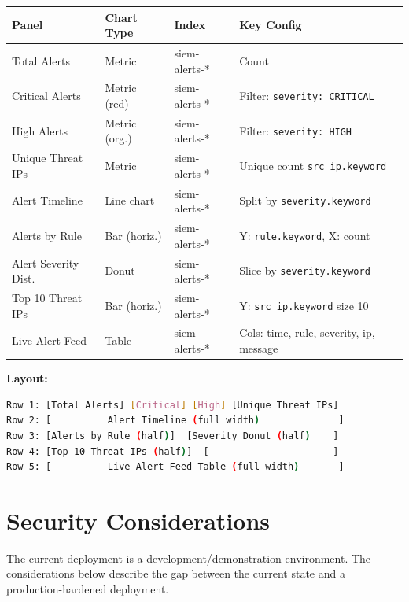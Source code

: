 \documentclass[12pt,a4paper]{article}
\newcommand{\field}[1]{\texttt{#1}}
\begin{document}
\begin{center}
\begin{tabular}{p{4cm}p{2.5cm}p{2.5cm}p{4cm}}
  \toprule
  \textbf{Panel} & \textbf{Chart Type} & \textbf{Index} & \textbf{Key Config} \\
  \midrule
  Total Alerts             & Metric       & siem-alerts-* & Count \\
  Critical Alerts          & Metric (red) & siem-alerts-* & Filter: \field{severity: CRITICAL} \\
  High Alerts              & Metric (org.)& siem-alerts-* & Filter: \field{severity: HIGH} \\
  Unique Threat IPs        & Metric       & siem-alerts-* & Unique count \field{src\_ip.keyword} \\
  Alert Timeline           & Line chart   & siem-alerts-* & Split by \field{severity.keyword} \\
  Alerts by Rule           & Bar (horiz.) & siem-alerts-* & Y: \field{rule.keyword}, X: count \\
  Alert Severity Dist.     & Donut        & siem-alerts-* & Slice by \field{severity.keyword} \\
  Top 10 Threat IPs        & Bar (horiz.) & siem-alerts-* & Y: \field{src\_ip.keyword} size 10 \\
  Live Alert Feed          & Table        & siem-alerts-* & Cols: time, rule, severity, ip, message \\
  \bottomrule
\end{tabular}
\end{center}

\textbf{Layout:}
\begin{lstlisting}[language=bash]
Row 1: [Total Alerts] [Critical] [High] [Unique Threat IPs]
Row 2: [          Alert Timeline (full width)              ]
Row 3: [Alerts by Rule (half)]  [Severity Donut (half)    ]
Row 4: [Top 10 Threat IPs (half)]  [                      ]
Row 5: [          Live Alert Feed Table (full width)       ]
\end{lstlisting}

\newpage

\section{Security Considerations}

\begin{infobox}
The current deployment is a development/demonstration environment.
The considerations below describe the gap between the current state and
a production-hardened deployment.
\end{infobox}
\end{document}
